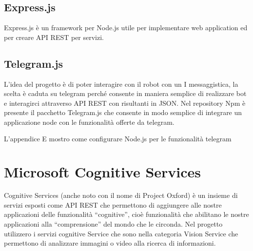 \subsection{Express.js}
Express.js è un framework per Node.js utile per implementare web application ed per creare API REST per servizi. 
\subsection{Telegram.js}
L’idea del progetto è di poter interagire con il robot con un I messaggistica, la scelta è caduta su telegram perché consente in maniera semplice di realizzare bot e interagirci attraverso API REST con risultanti in JSON. Nel repository Npm è presente il pacchetto Telegram.js che consente in modo semplice di integrare un applicazione node con le funzionalità offerte da telegram.

L'appendice E mostro come configurare Node.js per le funzionalità telegram

\section{Microsoft Cognitive Services} 
Cognitive Services (anche noto con il nome di Project Oxford) è un insieme di servizi esposti come API REST che permettono di aggiungere alle nostre applicazioni delle funzionalità “cognitive”, cioè funzionalità che abilitano le nostre applicazioni alla “comprensione” del mondo che le circonda. Nel progetto utilizzero i servizi cognitive Service che sono nella categoria Vision Service  che permettono di analizzare immagini o video alla ricerca di informazioni. 


